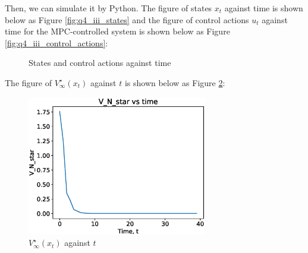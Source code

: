 \documentclass[a4paper,11pt,reqno]{amsart}
\begin{document}
Then, we can simulate it by Python. The figure of states $x_t$ against time is shown below as Figure \ref{fig:q4_iii_states}
and the figure of control actions $u_t$ against time for the MPC-controlled system is shown below as Figure \ref{fig:q4_iii_control_actions}:
\begin{figure}[H]
    \centering
    \vspace{-0.35cm}
    \subfigtopskip=2pt
    \subfigbottomskip=2pt
    \subfigcapskip=-5pt
    \quad
    \caption{States and control actions against time}
    \label{fig:q4_iii}
\end{figure}
The figure of $V^{\star}_{\infty}(x_t) $ against $t$ is shown below as Figure \ref{fig:q4_iii_cost}:
\begin{figure}[H]
    \centering
    \includegraphics[width=0.7\textwidth]{figures/q4_iii_cost.eps}
    \caption{$V^{\star}_{\infty}(x_t) $ against $t$}
    \label{fig:q4_iii_cost}
\end{figure}
\end{document}
